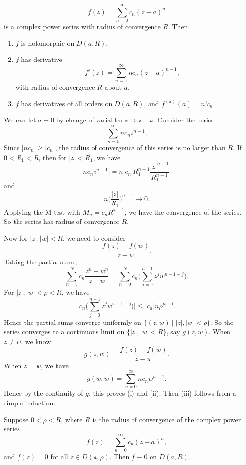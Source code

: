 \documentclass[12pt]{article}
\begin{document}
\begin{theorem} 
	\[
	f(z) = \sum_{n = 0}^{\infty} c_n(z - a)^{n}
	\]
	is a complex power series with radius of convergence $R$. Then,
	\begin{enumerate}[\normalfont(i)]
		\item $f$ is holomorphic on $D(a, R)$.
		\item $f$ has derivative
			\[
			f'(z) = \sum_{n = 1}^{\infty} n c_n (z - a)^{n-1}
			,\]
			with radius of convergence $R$ about $a$.
		\item $f$ has derivatives of all orders on $D(a, R)$, and $f^{(n)}(a) = n! c_n$.
	\end{enumerate}
\end{theorem}

\begin{proofbox}
	We can let $a = 0$ by change of variables $z \to z - a$. Consider the series
	\[
	\sum_{n = 1}^{\infty}n c_n z^{n-1}
	.\]
	Since $|n c_n| \geq |c_n|$, the radius of convergence of this series is no larger than $R$. If $0 < R_1 < R$, then for $|z| < R_1$, we have
	\[
	|n c_n z^{n-1}| = n |c_n| R_1^{n-1} \frac{|z|^{n-1}}{R_1^{n-1}}
	,\]
	and
	\[
	n \biggl( \frac{|z|}{R_1} \biggr)^{n-1} \to 0
	.\]
	Applying the M-test with $M_n = c_n R_1^{n-1}$, we have the convergence of the series. So the series has radius of convergence $R$.

	Now for $|z|, |w| < R$, we need to consider
	\[
	\frac{f(z) - f(w)}{z - w}
	.\]
	Taking the partial sums,
	\[
		\sum_{n = 0}^{N} c_n \frac{z^{n} - w^{n}}{z - w} = \sum_{n = 0}^{N} c_n \Biggl( \sum_{j = 0}^{n-1} z^{j}w^{n-1-j}\Biggr)
	.\]
	For $|z|, |w| < \rho < R$, we have
	\[
	\biggl| c_n \Biggl( \sum_{j = 0}^{n-1} z^{j} w^{n-1-j} \Biggr) \biggr| \leq |c_n| n \rho^{n-1}
	.\]
	Hence the partial sums converge uniformly on $\{(z, w) \mid |z|, |w| < \rho\}$. So the series converges to a continuous limit on $\{|z|, |w| < R\}$, say $g(z, w)$. When $z \neq w$, we know
	\[
	g(z, w) = \frac{f(z) - f(w)}{z - w}
	.\]
	When $z = w$, we have
	\[
	g(w, w) = \sum_{n = 0}^{\infty} n c_n w^{n-1}
	.\]
	Hence by the continuity of $g$, this proves (i) and (ii). Then (iii) follows from a simple induction.
\end{proofbox}

\begin{corollary}
	Suppose $0 < \rho < R$, where $R$ is the radius of convergence of the complex power series
	\[
	f(z) = \sum_{n = 0}^{\infty}c_n (z - a)^{n}
	,\]
	and $f(z) = 0$ for all $z \in D(a, \rho)$. Then $f \equiv 0$ on $D(a, R)$.
\end{corollary}
\end{document}
